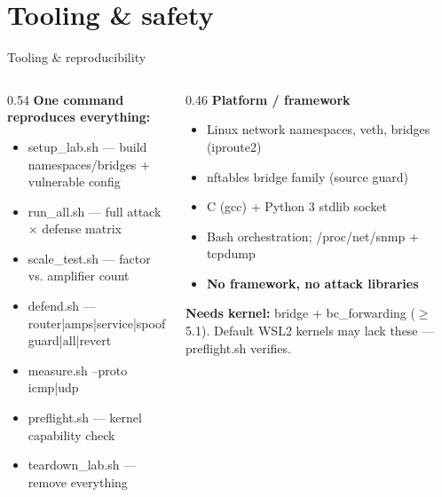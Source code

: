 \documentclass[aspectratio=169,10pt]{beamer}
\newcommand{\code}[1]{{\ttfamily #1}}
\begin{document}
\section{Tooling \& safety}
\begin{frame}{Tooling \& reproducibility}
  \begin{columns}[T]
    \begin{column}{0.54\textwidth}
      \small\textbf{One command reproduces everything:}
      \begin{itemize}\small
        \item \code{setup\_lab.sh} — build namespaces/bridges + vulnerable config
        \item \code{run\_all.sh} — full attack $\times$ defense matrix
        \item \code{scale\_test.sh} — factor vs. amplifier count
        \item \code{defend.sh} — \code{router|amps|service|spoofguard|all|revert}
        \item \code{measure.sh} \code{--proto icmp|udp}
        \item \code{preflight.sh} — kernel capability check
        \item \code{teardown\_lab.sh} — remove everything
      \end{itemize}
    \end{column}
    \begin{column}{0.46\textwidth}
      \small\textbf{Platform / framework}
      \begin{itemize}\small
        \item Linux network namespaces, \code{veth}, bridges (\code{iproute2})
        \item \code{nftables} bridge family (source guard)
        \item C (\code{gcc}) + Python 3 stdlib \code{socket}
        \item Bash orchestration; \code{/proc/net/snmp} + \code{tcpdump}
        \item \textbf{No framework, no attack libraries}
      \end{itemize}
      \footnotesize\textbf{Needs kernel:} \code{bridge} + \code{bc\_forwarding}
      ($\geq$ 5.1). Default WSL2 kernels may lack these — \code{preflight.sh} verifies.
    \end{column}
  \end{columns}
\end{frame}
\end{document}
